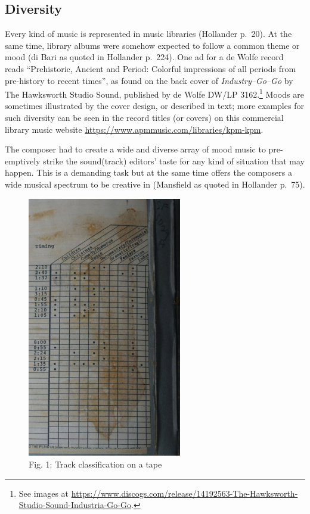 \documentclass[a4paper,
fontsize=11pt,
oneside,
numbers=noperiodatend,
parskip=half-,
bibliography=totoc,
final
]{scrartcl}
\begin{document}
\hypertarget{diversity}{%
\subsection{Diversity}\label{diversity}}

Every kind of music is represented in music libraries (Hollander p.~20).
At the same time, library albums were somehow expected to follow a
common theme or mood (di Bari as quoted in Hollander p.~224). One ad for
a de Wolfe record reads \enquote{Prehistoric, Ancient and Period:
Colorful impressions of all periods from pre-history to recent times},
as found on the back cover of \emph{Industry--Go--Go} by The Hawksworth
Studio Sound, published by de Wolfe DW/LP 3162.\footnote{See images at
  \url{https://www.discogs.com/release/14192563-The-Hawksworth-Studio-Sound-Industria-Go-Go}.}
Moods are sometimes illustrated by the cover design, or described in
text; more examples for such diversity can be seen in the record titles
(or covers) on this commercial library music website
\url{https://www.apmmusic.com/libraries/kpm-kpm}.

The composer had to create a wide and diverse array of mood music to
pre-emptively strike the sound(track) editors' taste for any kind of
situation that may happen. This is a demanding task but at the same time
offers the composers a wide musical spectrum to be creative in
(Mansfield as quoted in Hollander p.~75).

\begin{figure}
\centering
\includegraphics[width=0.6\textwidth]{img/Fig1.jpg}
\caption{Fig. 1: Track classification on a tape}
\end{figure}
\end{document}

